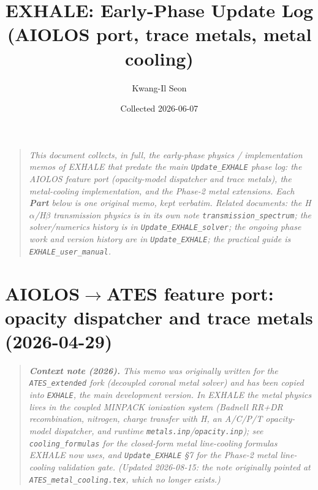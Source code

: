 \documentclass[english,a4paper]{my_memo}
\begin{document}
\title{EXHALE: Early-Phase Update Log\\(AIOLOS port, trace metals, metal cooling)}
\author{Kwang-Il Seon}
\date{Collected 2026-06-07}
\maketitle

\begin{quote}\small\itshape
This document collects, in full, the early-phase \emph{physics / implementation}
memos of EXHALE that predate the main \texttt{Update\_EXHALE} phase log: the
AIOLOS feature port (opacity-model dispatcher and trace metals), the metal-cooling
implementation, and the Phase-2 metal extensions. Each \textbf{Part} below is one
original memo, kept verbatim. Related documents: the H$\alpha$/H$\beta$
transmission physics is in its own note \texttt{transmission\_spectrum}; the
solver/numerics history is in \texttt{Update\_EXHALE\_solver}; the ongoing phase work
and version history are in \texttt{Update\_EXHALE}; the practical guide is
\texttt{EXHALE\_user\_manual}.
\end{quote}

\tableofcontents
\bigskip



\part{AIOLOS$\to$ATES feature port: opacity dispatcher and trace metals (2026-04-29)}

\begin{quote}\small\itshape
\textbf{Context note (2026).} This memo was originally written for the
\texttt{ATES\_extended} fork (decoupled coronal metal solver) and has
been copied into \texttt{EXHALE}, the main development version. In
EXHALE the metal physics lives in the coupled MINPACK ionization
system (Badnell RR+DR recombination, nitrogen, charge transfer with H,
an A/C/P/T opacity-model dispatcher, and runtime
\texttt{metals.inp}/\texttt{opacity.inp}); see
\texttt{cooling\_formulas} for the closed-form metal line-cooling formulas
EXHALE now uses, and \texttt{Update\_EXHALE} \S7 for the Phase-2 metal
line-cooling validation gate. (Updated 2026-08-15: the note originally
pointed at \texttt{ATES\_metal\_cooling.tex}, which no longer exists.)
\end{quote}
\end{document}
